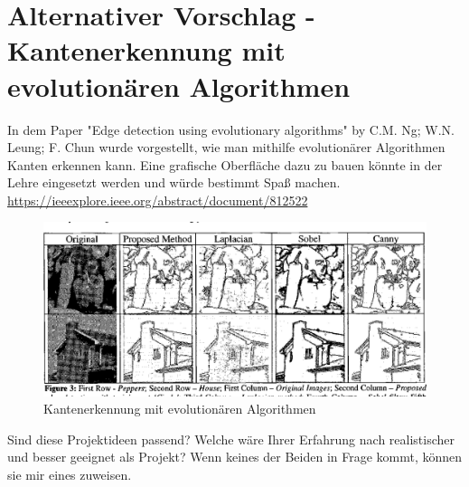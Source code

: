 \documentclass[ngerman]{article}
\begin{document}
\section{Alternativer Vorschlag - Kantenerkennung mit evolutionären Algorithmen}


In dem Paper "Edge detection using evolutionary algorithms" by C.M. Ng; W.N. Leung; F. Chun wurde vorgestellt, wie man mithilfe evolutionärer Algorithmen Kanten erkennen kann. Eine grafische Oberfläche dazu zu bauen könnte in der Lehre eingesetzt werden und würde bestimmt Spaß machen.  
\url{https://ieeexplore.ieee.org/abstract/document/812522}

\begin{figure}[h]
	\centering
	\includegraphics[width=0.4\linewidth]{geneticcanny.png}
	\caption{Kantenerkennung mit evolutionären Algorithmen}
	\label{fig::can}
\end{figure}

Sind diese Projektideen passend? Welche wäre Ihrer Erfahrung nach realistischer und besser geeignet als Projekt? Wenn keines der Beiden in Frage kommt, können sie mir eines zuweisen.
\end{document}
